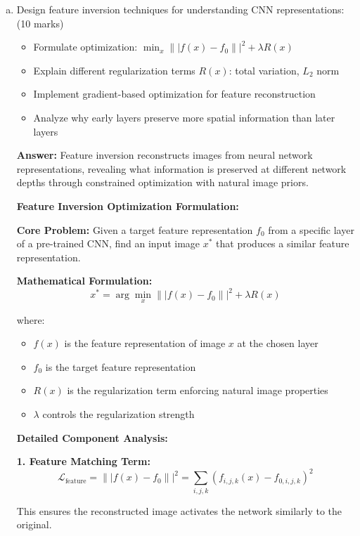 \documentclass[12pt]{article}
\newcommand{\answer}[1]{{\color{answercolor}\textbf{Answer:} #1}}
\newcommand{\explanation}[1]{{\color{explanationcolor}#1}}
\begin{document}
\begin{enumerate}[(a)]
    \item Design feature inversion techniques for understanding CNN representations: \hfill (10 marks)
    \begin{itemize}
        \item Formulate optimization: $\min_x \||f(x) - f_0\||^2 + \lambda R(x)$
        \item Explain different regularization terms $R(x)$: total variation, $L_2$ norm
        \item Implement gradient-based optimization for feature reconstruction
        \item Analyze why early layers preserve more spatial information than later layers
    \end{itemize}
    
    \answer{Feature inversion reconstructs images from neural network representations, revealing what information is preserved at different network depths through constrained optimization with natural image priors.}
    
    \explanation{
    \textbf{Feature Inversion Optimization Formulation:}
    
    \textbf{Core Problem:}
    Given a target feature representation $f_0$ from a specific layer of a pre-trained CNN, find an input image $x^*$ that produces a similar feature representation.
    
    \textbf{Mathematical Formulation:}
    $$x^* = \arg\min_x \||f(x) - f_0\||^2 + \lambda R(x)$$
    
    where:
    \begin{itemize}
        \item $f(x)$ is the feature representation of image $x$ at the chosen layer
        \item $f_0$ is the target feature representation
        \item $R(x)$ is the regularization term enforcing natural image properties
        \item $\lambda$ controls the regularization strength
    \end{itemize}
    
    \textbf{Detailed Component Analysis:}
    
    \textbf{1. Feature Matching Term:}
    $$\mathcal{L}_{\text{feature}} = \||f(x) - f_0\||^2 = \sum_{i,j,k} (f_{i,j,k}(x) - f_{0,i,j,k})^2$$
    
    This ensures the reconstructed image activates the network similarly to the original.
    
}
\end{enumerate}
\end{document}
